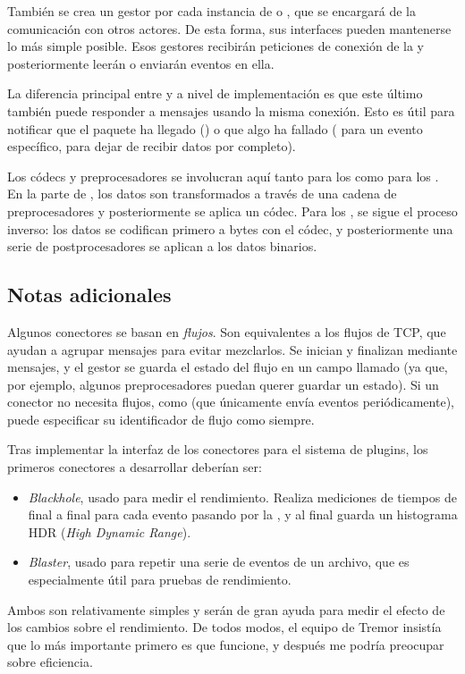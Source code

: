 También se crea un gestor por cada instancia de \sink o \source, que se
encargará de la comunicación con otros actores. De esta forma, sus interfaces
pueden mantenerse lo más simple posible. Esos gestores recibirán peticiones de
conexión de la \pipeline y posteriormente leerán o enviarán eventos en ella.

La diferencia principal entre \sources y \sinks a nivel de implementación es que
este último también puede responder a mensajes usando la misma conexión. Esto es
útil para notificar que el paquete ha llegado () o que algo ha fallado
( para un evento específico,  para dejar de
recibir datos por completo).

Los códecs y preprocesadores se involucran aquí tanto para los \sources como
para los \sinks. En la parte de \source, los datos son transformados a través de
una cadena de preprocesadores y posteriormente se aplica un códec. Para los
\sinks, se sigue el proceso inverso: los datos se codifican primero a bytes con
el códec, y posteriormente una serie de postprocesadores se aplican a los datos
binarios.

\subsection{Notas adicionales}

Algunos conectores se basan en \emph{flujos}. Son equivalentes a los flujos de
TCP, que ayudan a agrupar mensajes para evitar mezclarlos. Se inician y
finalizan mediante mensajes, y el gestor se guarda el estado del flujo en un
campo llamado  (ya que, por ejemplo, algunos preprocesadores puedan
querer guardar un estado). Si un conector no necesita flujos, como
 (que únicamente envía eventos periódicamente), puede
especificar su identificador de flujo como  siempre.

Tras implementar la interfaz de los conectores para el sistema de plugins,
los primeros conectores a desarrollar deberían ser:

\begin{itemize}
    \item \emph{Blackhole}, usado para medir el rendimiento. Realiza mediciones
        de tiempos de final a final para cada evento pasando por la \pipeline, y
        al final guarda un histograma HDR (\emph{High Dynamic Range}).

    \item \emph{Blaster}, usado para repetir una serie de eventos de un archivo,
        que es especialmente útil para pruebas de rendimiento.

\end{itemize}

Ambos son relativamente simples y serán de gran ayuda para medir el efecto de
los cambios sobre el rendimiento. De todos modos, el equipo de Tremor insistía
que lo más importante primero es que funcione, y después me podría preocupar
sobre eficiencia.

